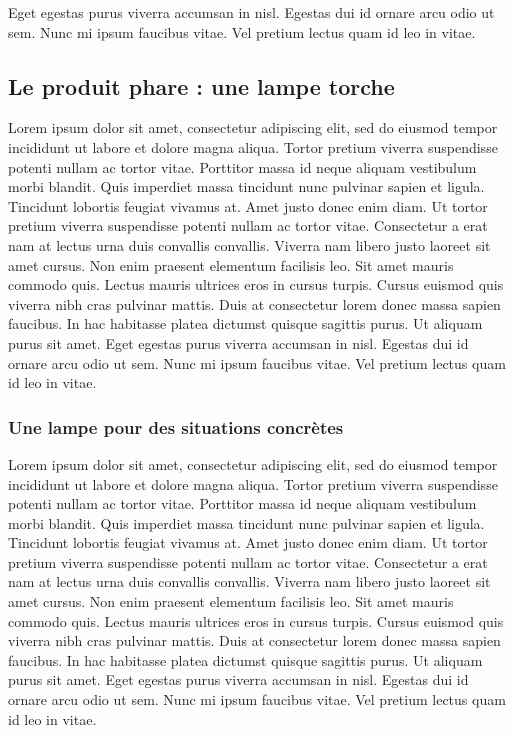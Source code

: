 Eget egestas purus viverra accumsan
in nisl. Egestas dui id ornare arcu odio ut sem. Nunc mi ipsum faucibus
vitae. Vel pretium lectus quam id leo in vitae.

\subsection{Le produit phare : une lampe torche}

Lorem ipsum dolor sit amet, consectetur adipiscing elit, sed do eiusmod
tempor incididunt ut labore et dolore magna aliqua. Tortor pretium
viverra suspendisse potenti nullam ac tortor vitae. Porttitor massa id
neque aliquam vestibulum morbi blandit. Quis imperdiet massa tincidunt
nunc pulvinar sapien et ligula. Tincidunt lobortis feugiat vivamus
at. Amet justo donec enim diam. Ut tortor pretium viverra suspendisse
potenti nullam ac tortor vitae. Consectetur a erat nam at lectus urna
duis convallis convallis. Viverra nam libero justo laoreet sit amet
cursus. Non enim praesent elementum facilisis leo. Sit amet mauris
commodo quis. Lectus mauris ultrices eros in cursus turpis. Cursus euismod
quis viverra nibh cras pulvinar mattis. Duis at consectetur lorem donec
massa sapien faucibus. In hac habitasse platea dictumst quisque sagittis
purus. Ut aliquam purus sit amet. Eget egestas purus viverra accumsan
in nisl. Egestas dui id ornare arcu odio ut sem. Nunc mi ipsum faucibus
vitae. Vel pretium lectus quam id leo in vitae.

\subsubsection{Une lampe pour des situations concrètes}

Lorem ipsum dolor sit amet, consectetur adipiscing elit, sed do eiusmod
tempor incididunt ut labore et dolore magna aliqua. Tortor pretium
viverra suspendisse potenti nullam ac tortor vitae. Porttitor massa id
neque aliquam vestibulum morbi blandit. Quis imperdiet massa tincidunt
nunc pulvinar sapien et ligula. Tincidunt lobortis feugiat vivamus
at. Amet justo donec enim diam. Ut tortor pretium viverra suspendisse
potenti nullam ac tortor vitae. Consectetur a erat nam at lectus urna
duis convallis convallis. Viverra nam libero justo laoreet sit amet
cursus. Non enim praesent elementum facilisis leo. Sit amet mauris
commodo quis. Lectus mauris ultrices eros in cursus turpis. Cursus euismod
quis viverra nibh cras pulvinar mattis. Duis at consectetur lorem donec
massa sapien faucibus. In hac habitasse platea dictumst quisque sagittis
purus. Ut aliquam purus sit amet. Eget egestas purus viverra accumsan
in nisl. Egestas dui id ornare arcu odio ut sem. Nunc mi ipsum faucibus
vitae. Vel pretium lectus quam id leo in vitae.


